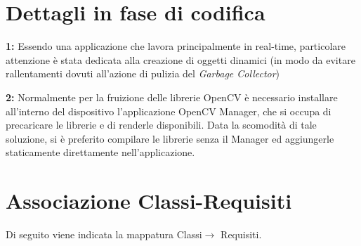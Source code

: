 \section{Dettagli in fase di codifica}

\textbf{1:} Essendo una applicazione che lavora principalmente in real-time, particolare attenzione è stata dedicata alla creazione di oggetti dinamici (in modo da evitare rallentamenti dovuti all'azione di pulizia del \textit{Garbage Collector})

\textbf{2:} Normalmente per la fruizione delle librerie OpenCV è necessario installare all'interno del dispositivo l'applicazione OpenCV Manager, che si occupa di precaricare le librerie e di renderle disponibili. Data la scomodità di tale soluzione, si è preferito compilare le librerie senza il Manager ed aggiungerle staticamente direttamente nell'applicazione.

\newpage

\section{Associazione Classi-Requisiti}

Di seguito viene indicata la mappatura Classi$\rightarrow$ Requisiti.

